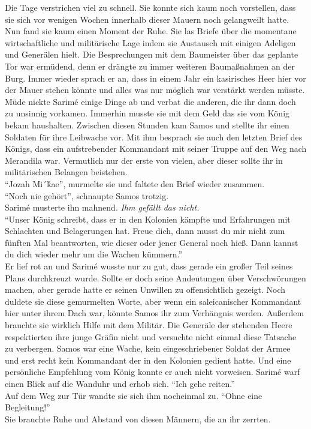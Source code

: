 Die Tage verstrichen viel zu schnell. Sie konnte sich kaum noch vorstellen, dass sie sich vor 
wenigen Wochen innerhalb dieser Mauern noch gelangweilt hatte. Nun fand sie kaum einen Moment der 
Ruhe. Sie las Briefe über die momentane wirtschaftliche und militärische Lage indem sie  
Austausch mit einigen Adeligen und Generälen hielt. Die Besprechungen mit dem Baumeister über 
das geplante Tor war ermüdend, denn er drängte zu immer weiteren Baumaßnahmen an der Burg. Immer 
wieder sprach er an, dass in einem Jahr ein kasirisches Heer hier vor der Mauer stehen könnte und 
alles was nur möglich war verstärkt werden müsste. Müde nickte Sarimé einige Dinge ab und verbat die 
anderen, die ihr dann doch zu unsinnig vorkamen. Immerhin musste sie mit dem Geld das sie vom König 
bekam haushalten. Zwischen diesen Stunden kam Samos und stellte ihr einen Soldaten für ihre 
Leibwache vor. Mit ihm besprach sie auch den letzten Brief des Königs, dass ein aufstrebender 
Kommandant mit seiner Truppe auf den Weg nach Merandila war. Vermutlich nur der erste von vielen, 
aber dieser sollte ihr in militärischen Belangen beistehen. \\
``Jozah Mi´ḱae'', murmelte sie und faltete den Brief wieder zusammen.\\
``Noch nie gehört'', schnaupte Samos trotzig.\\
Sarimé musterte ihn mahnend. \textit{Ihm gefällt das nicht.}\\
``Unser König schreibt, dass er in den Kolonien kämpfte und Erfahrungen mit Schlachten und 
Belagerungen hat. Freue dich, dann musst du mir nicht zum fünften Mal beantworten, wie dieser oder 
jener General noch hieß. Dann kannst du dich wieder mehr um die Wachen kümmern.''\\
Er lief rot an und Sarimé wusste nur zu gut, dass gerade ein großer Teil seines Plans durchkreuzt 
wurde. Sollte er doch seine Andeutungen über Verschwörungen machen, aber gerade hatte er seinen 
Unwillen zu offensichtlich gezeigt. Noch duldete sie diese gemurmelten Worte, aber wenn ein 
saleicanischer Kommandant hier unter ihrem Dach war, könnte Samos ihr zum Verhängnis werden. 
Außerdem brauchte sie wirklich Hilfe mit dem Militär. Die Generäle der stehenden Heere respektierten 
ihre junge Gräfin nicht und versuchte nicht einmal diese Tatsache zu verbergen. Samos war eine 
Wache, kein eingeschriebener Soldat der Armee und erst recht kein Kommandant der in den Kolonien 
gedient hatte. Und eine persönliche Empfehlung vom König konnte er auch nicht vorweisen. Sarimé warf 
einen Blick auf die Wanduhr und erhob sich. ``Ich gehe reiten.''\\
Auf dem Weg zur Tür wandte sie sich ihm nocheinmal zu. ``Ohne eine Begleitung!''\\
Sie brauchte Ruhe und Abstand von diesen Männern, die an ihr zerrten. \\

